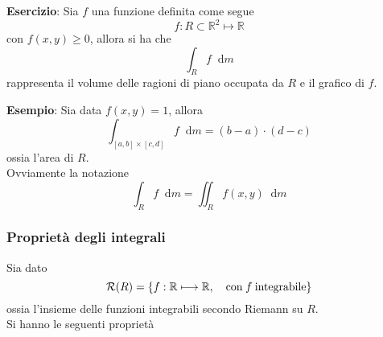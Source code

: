 \documentclass[a4paper]{extarticle}
\newcommand*\dif{\mathop{}\!\mathrm{d}}
\begin{document}
\vspace{1em}
\noindent
\textbf{Esercizio}: Sia $f$ una funzione definita come segue
\[f : R \subset \mathbb{R}^2 \longmapsto \mathbb{R}\]
con $f(x,y) \geq 0$, allora si ha che
\[\int_R f \dif m\]
rappresenta il volume delle ragioni di piano occupata da $R$ e il grafico di $f$.

\vspace{1em}
\noindent
\textbf{Esempio}: Sia data $f(x,y) = 1$, allora
\[\int_{[a,b] \times [c,d]} f \dif m = (b-a) \cdot (d-c)\]
ossia l'area di $R$.\\
Ovviamente la notazione
\[\int_R f \dif m = \iint_R f(x,y) \dif m\]

\vspace{1em}
\subsubsection{Proprietà degli integrali}
Sia dato
\[\mathcal{R}(R) = \{f : \mathbb{R} \longmapsto \mathbb{R}, \hspace{1em} \text{con} \hspace{0.25em} f \hspace{0.25em} \text{integrabile}\}\]
ossia l'insieme delle funzioni integrabili secondo Riemann su $R$.\\
Si hanno le seguenti proprietà
\end{document}
